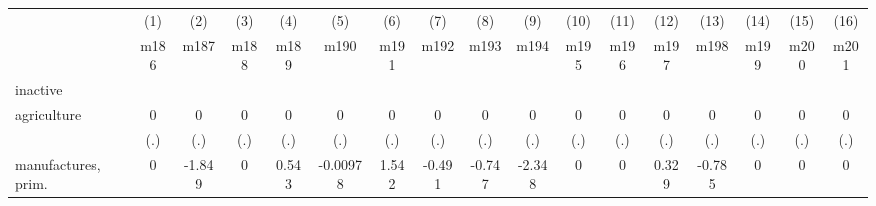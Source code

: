 {
\def\sym#1{\ifmmode^{#1}\else\(^{#1}\)\fi}
\begin{tabular}{l*{16}{c}}
\hline\hline
                    &\multicolumn{1}{c}{(1)}&\multicolumn{1}{c}{(2)}&\multicolumn{1}{c}{(3)}&\multicolumn{1}{c}{(4)}&\multicolumn{1}{c}{(5)}&\multicolumn{1}{c}{(6)}&\multicolumn{1}{c}{(7)}&\multicolumn{1}{c}{(8)}&\multicolumn{1}{c}{(9)}&\multicolumn{1}{c}{(10)}&\multicolumn{1}{c}{(11)}&\multicolumn{1}{c}{(12)}&\multicolumn{1}{c}{(13)}&\multicolumn{1}{c}{(14)}&\multicolumn{1}{c}{(15)}&\multicolumn{1}{c}{(16)}\\
                    &\multicolumn{1}{c}{m186}&\multicolumn{1}{c}{m187}&\multicolumn{1}{c}{m188}&\multicolumn{1}{c}{m189}&\multicolumn{1}{c}{m190}&\multicolumn{1}{c}{m191}&\multicolumn{1}{c}{m192}&\multicolumn{1}{c}{m193}&\multicolumn{1}{c}{m194}&\multicolumn{1}{c}{m195}&\multicolumn{1}{c}{m196}&\multicolumn{1}{c}{m197}&\multicolumn{1}{c}{m198}&\multicolumn{1}{c}{m199}&\multicolumn{1}{c}{m200}&\multicolumn{1}{c}{m201}\\
\hline
inactive            &                     &                     &                     &                     &                     &                     &                     &                     &                     &                     &                     &                     &                     &                     &                     &                     \\
agriculture         &           0         &           0         &           0         &           0         &           0         &           0         &           0         &           0         &           0         &           0         &           0         &           0         &           0         &           0         &           0         &           0         \\
                    &         (.)         &         (.)         &         (.)         &         (.)         &         (.)         &         (.)         &         (.)         &         (.)         &         (.)         &         (.)         &         (.)         &         (.)         &         (.)         &         (.)         &         (.)         &         (.)         \\
[1em]
manufactures, prim. &           0         &      -1.849         &           0         &       0.543         &    -0.00978         &       1.542         &      -0.491         &      -0.747         &      -2.348         &           0         &           0         &       0.329         &      -0.785         &           0         &           0         &           0         \\

\end{tabular}}

